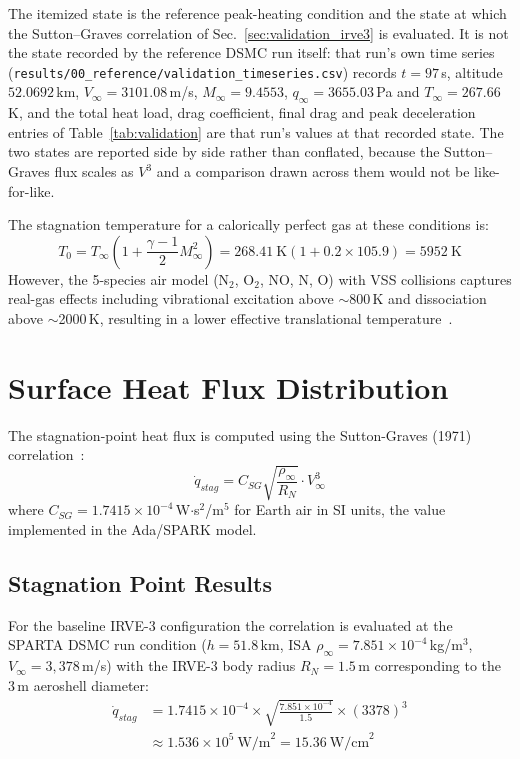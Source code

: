 The itemized state is the reference peak-heating condition and the state at which the Sutton--Graves correlation of Sec.~\ref{sec:validation_irve3} is evaluated. It is not the state recorded by the reference DSMC run itself: that run's own time series (\texttt{results/00\_reference/validation\_timeseries.csv}) records $t = 97$\,s, altitude $52.0692$\,km, $V_{\infty} = 3101.08$\,m/s, $M_{\infty} = 9.4553$, $q_{\infty} = 3655.03$\,Pa and $T_{\infty} = 267.66$\,K, and the total heat load, drag coefficient, final drag and peak deceleration entries of Table~\ref{tab:validation} are that run's values at that recorded state. The two states are reported side by side rather than conflated, because the Sutton--Graves flux scales as $V^3$ and a comparison drawn across them would not be like-for-like.

The stagnation temperature for a calorically perfect gas at these conditions is:
\begin{equation}
    T_0 = T_{\infty} \left( 1 + \frac{\gamma - 1}{2} M_{\infty}^2 \right) = 268.41 \ \text{K} \left( 1 + 0.2 \times 105.9 \right) = 5952 \ \text{K}
\end{equation}
However, the 5-species air model (N$_2$, O$_2$, NO, N, O) with VSS collisions captures real-gas effects including vibrational excitation above $\sim$800\,K and dissociation above $\sim$2000\,K, resulting in a lower effective translational temperature~\cite{bird1994molecular}.

\section{Surface Heat Flux Distribution}
The stagnation-point heat flux is computed using the Sutton-Graves (1971) correlation~\cite{sutton1971gravesh}:
\begin{equation}
    \dot{q}_{stag} = C_{SG} \sqrt{\frac{\rho_{\infty}}{R_N}} \cdot V_{\infty}^3
\end{equation}
where $C_{SG} = 1.7415 \times 10^{-4}$\,W$\cdot$s$^2$/m$^{5}$ for Earth air in SI units, the value implemented in the Ada/SPARK model.

\subsection{Stagnation Point Results}
For the baseline IRVE-3 configuration the correlation is evaluated at the SPARTA DSMC run condition ($h = 51.8$\,km, ISA $\rho_{\infty} = 7.851 \times 10^{-4}$\,kg/m$^3$, $V_{\infty} = 3{,}378$\,m/s) with the IRVE-3 body radius $R_N = 1.5$\,m corresponding to the 3\,m aeroshell diameter:
\begin{equation}
    \begin{split}
        \dot{q}_{stag} &= 1.7415 \times 10^{-4} \times \sqrt{\frac{7.851 \times 10^{-4}}{1.5}} \times (3378)^3 \\
        &\approx 1.536 \times 10^{5} \ \text{W/m}^2 = 15.36 \ \text{W/cm}^2
    \end{split}
\end{equation}

